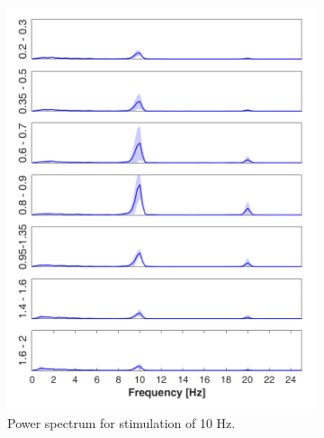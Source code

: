 \documentclass{pracalicmgr}
\begin{document}
\begin{figure}[H]
		
	\begin{subfigure}{.5\textwidth}
		\centering
		\includegraphics[width=1.\linewidth]{widmo_10Hz.png}
		\caption{Power spectrum for stimulation of 10 Hz.}
		\label{rys:widmo_10Hz}
	\end{subfigure}
	\begin{subfigure}{.5\textwidth}
		\centering

\end{subfigure}
\end{figure}
\end{document}
